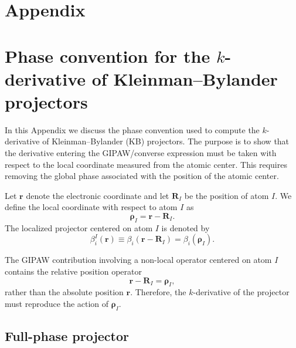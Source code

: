 \documentclass[11pt]{article}
\begin{document}
\appendix
\section*{Appendix}

\section{Phase convention for the $k$-derivative of Kleinman--Bylander projectors}
\label{app:kb_no_phase}

In this Appendix we discuss the phase convention used to compute the
$k$-derivative of Kleinman--Bylander (KB) projectors. The purpose is to
show that the derivative entering the GIPAW/converse expression must be
taken with respect to the local coordinate measured from the atomic
center. This requires removing the global phase associated with the
position of the atomic center.

Let $\mathbf r$ denote the electronic coordinate and let $\mathbf R_I$
be the position of atom $I$. We define the local coordinate with respect
to atom $I$ as
\begin{equation}
\boldsymbol{\rho}_I = \mathbf r - \mathbf R_I .
\label{eq:rho_def_app}
\end{equation}
The localized projector centered on atom $I$ is denoted by
\begin{equation}
\beta_i^I(\mathbf r) \equiv \beta_i(\mathbf r-\mathbf R_I)
= \beta_i(\boldsymbol{\rho}_I) .
\label{eq:beta_centered_def}
\end{equation}

The GIPAW contribution involving a non-local operator centered on atom
$I$ contains the relative position operator
\begin{equation}
\mathbf r - \mathbf R_I = \boldsymbol{\rho}_I ,
\end{equation}
rather than the absolute position $\mathbf r$. Therefore, the
$k$-derivative of the projector must reproduce the action of
$\boldsymbol{\rho}_I$.

\subsection{Full-phase projector}
\end{document}
